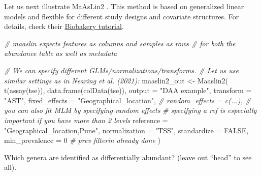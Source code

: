 \documentclass[
]{book}
\newenvironment{Shaded}{\begin{snugshade}}{\end{snugshade}}
\newcommand{\AttributeTok}[1]{\textcolor[rgb]{0.77,0.63,0.00}{#1}}
\newcommand{\CommentTok}[1]{\textcolor[rgb]{0.56,0.35,0.01}{\textit{#1}}}
\newcommand{\ConstantTok}[1]{\textcolor[rgb]{0.00,0.00,0.00}{#1}}
\newcommand{\DecValTok}[1]{\textcolor[rgb]{0.00,0.00,0.81}{#1}}
\newcommand{\FloatTok}[1]{\textcolor[rgb]{0.00,0.00,0.81}{#1}}
\newcommand{\FunctionTok}[1]{\textcolor[rgb]{0.00,0.00,0.00}{#1}}
\newcommand{\NormalTok}[1]{#1}
\newcommand{\OtherTok}[1]{\textcolor[rgb]{0.56,0.35,0.01}{#1}}
\newcommand{\SpecialCharTok}[1]{\textcolor[rgb]{0.00,0.00,0.00}{#1}}
\newcommand{\StringTok}[1]{\textcolor[rgb]{0.31,0.60,0.02}{#1}}
\begin{document}
Let us next illustrate MaAsLin2 \citep{Mallick2020}. This method is based on
generalized linear models and flexible for different study designs
and covariate structures. For details, check their
\href{https://github.com/biobakery/biobakery/wiki/maaslin2}{Biobakery tutorial}.

\begin{Shaded}
\begin{Highlighting}[]
\CommentTok{\# maaslin expects features as columns and samples as rows }
\CommentTok{\# for both the abundance table as well as metadata }

\CommentTok{\# We can specify different GLMs/normalizations/transforms.}
\CommentTok{\# Let us use similar settings as in Nearing et al. (2021):}
\NormalTok{maaslin2\_out }\OtherTok{\textless{}{-}} \FunctionTok{Maaslin2}\NormalTok{(}
  \FunctionTok{t}\NormalTok{(}\FunctionTok{assay}\NormalTok{(tse)),}
  \FunctionTok{data.frame}\NormalTok{(}\FunctionTok{colData}\NormalTok{(tse)),}
  \AttributeTok{output =} \StringTok{"DAA example"}\NormalTok{,}
  \AttributeTok{transform =} \StringTok{"AST"}\NormalTok{,}
  \AttributeTok{fixed\_effects =} \StringTok{"Geographical\_location"}\NormalTok{,}
  \CommentTok{\# random\_effects = c(...), \# you can also fit MLM by specifying random effects}
  \CommentTok{\# specifying a ref is especially important if you have more than 2 levels}
  \AttributeTok{reference =} \StringTok{"Geographical\_location,Pune"}\NormalTok{,  }
  \AttributeTok{normalization =} \StringTok{"TSS"}\NormalTok{,}
  \AttributeTok{standardize =} \ConstantTok{FALSE}\NormalTok{,}
  \AttributeTok{min\_prevalence =} \DecValTok{0} \CommentTok{\# prev filterin already done}
\NormalTok{)}
\end{Highlighting}
\end{Shaded}

Which genera are identified as differentially abundant? (leave out ``head'' to see all).

\begin{Shaded}
\end{Shaded}
\end{document}
